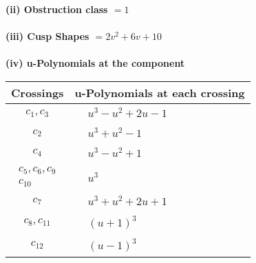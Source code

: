 \documentclass[1p]{elsarticle_modified}
\theoremstyle{definition}
\begin{document}
\flushleft \textbf{(ii) Obstruction class $= 1$}\\~\\
\flushleft \textbf{(iii) Cusp Shapes $= 2 v^2+6 v+10$}\\~\\
\newpage\renewcommand{\arraystretch}{1}
\flushleft \textbf{(iv) u-Polynomials at the component}\newline \\
\begin{tabular}{m{50pt}|m{274pt}}
Crossings & \hspace{64pt}u-Polynomials at each crossing \\
\hline $$\begin{aligned}c_{1},c_{3}\end{aligned}$$&$\begin{aligned}
&u^3- u^2+2 u-1
\end{aligned}$\\
\hline $$\begin{aligned}c_{2}\end{aligned}$$&$\begin{aligned}
&u^3+u^2-1
\end{aligned}$\\
\hline $$\begin{aligned}c_{4}\end{aligned}$$&$\begin{aligned}
&u^3- u^2+1
\end{aligned}$\\
\hline $$\begin{aligned}c_{5},c_{6},c_{9}\\c_{10}\end{aligned}$$&$\begin{aligned}
&u^3
\end{aligned}$\\
\hline $$\begin{aligned}c_{7}\end{aligned}$$&$\begin{aligned}
&u^3+u^2+2 u+1
\end{aligned}$\\
\hline $$\begin{aligned}c_{8},c_{11}\end{aligned}$$&$\begin{aligned}
&(u+1)^3
\end{aligned}$\\
\hline $$\begin{aligned}c_{12}\end{aligned}$$&$\begin{aligned}
&(u-1)^3
\end{aligned}$\\
\hline
\end{tabular}\\~\\
\end{document}
